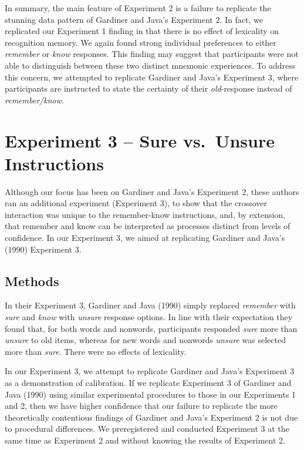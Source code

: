 \documentclass[english,,man,floatsintext]{apa6}
\begin{document}
In summary, the main feature of Experiment 2 is a failure to replicate the stunning data pattern of Gardiner and Java's Experiment 2. In fact, we replicated our Experiment 1 finding in that there is no effect of lexicality on recognition memory. We again found strong individual preferences to either \emph{remember} or \emph{know} responses. This finding may suggest that participants were not able to distinguish between these two distinct mnemonic experiences. To address this concern, we attempted to replicate Gardiner and Java's Experiment 3, where participants are instructed to state the certainty of their \emph{old}-response instead of \emph{remember/know}.

\hypertarget{experiment-3-sure-vs.-unsure-instructions}{%
\section{Experiment 3 -- Sure vs.~Unsure Instructions}\label{experiment-3-sure-vs.-unsure-instructions}}

Although our focus has been on Gardiner and Java's Experiment 2, these authors ran an additional experiment (Experiment 3), to show that the crossover interaction was unique to the remember-know instructions, and, by extension, that remember and know can be interpreted as processes distinct from levels of confidence. In our Experiment 3, we aimed at replicating Gardiner and Java's (1990) Experiment 3.

\hypertarget{methods-2}{%
\subsection{Methods}\label{methods-2}}

In their Experiment 3, Gardiner and Java (1990) simply replaced \emph{remember} with \emph{sure} and \emph{know} with \emph{unsure} response options. In line with their expectation they found that, for both words and nonwords, participants responded \emph{sure} more than \emph{unsure} to old items, whereas for new words and nonwords \emph{unsure} was selected more than \emph{sure}. There were no effects of lexicality.

In our Experiment 3, we attempt to replicate Gardiner and Java's Experiment 3 as a demonstration of calibration. If we replicate Experiment 3 of Gardiner and Java (1990) using similar experimental procedures to those in our Experiments 1 and 2, then we have higher confidence that our failure to replicate the more theoretically contentious findings of Gardiner and Java's Experiment 2 is not due to procedural differences. We preregistered and conducted Experiment 3 at the same time as Experiment 2 and without knowing the results of Experiment 2.
\end{document}
